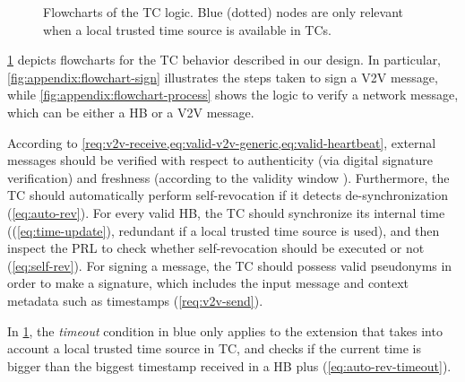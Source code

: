 \begin{figure}
\begin{subfigure}[T]{.4\columnwidth}
    \end{subfigure}
    \begin{minipage}{.45\columnwidth}
        \leavevmode{}
        \label{fig:appendix:flowchart-sign}
    \end{minipage}\hfil
    \begin{minipage}{.45\columnwidth}
        \leavevmode{}
        \label{fig:appendix:flowchart-process}
    \end{minipage}
    \caption{Flowcharts of the \acs{TC} logic. Blue (dotted) nodes are only
    relevant when a local trusted time source is available in \acsp{TC}.}
    \label{fig:appendix:flowchart}
\end{figure}

\cref{fig:appendix:flowchart} depicts flowcharts for the \ac{TC} behavior
described in our design. In particular, \cref{fig:appendix:flowchart-sign}
illustrates the steps taken to sign a \ac{V2V} message, while
\cref{fig:appendix:flowchart-process} shows the logic to verify a network
message, which can be either a \ac{HB} or a \ac{V2V} message.

According to \cref{req:v2v-receive,eq:valid-v2v-generic,eq:valid-heartbeat},
external messages should be verified with respect to authenticity (via digital
signature verification) and freshness (according to the validity window
\paramtt). Furthermore, the \ac{TC} should automatically perform self-revocation
if it detects de-synchronization (\cref{eq:auto-rev}). For every valid \ac{HB},
the \ac{TC} should synchronize its internal time \funcnow{}
((\cref{eq:time-update}), redundant if a local trusted time source is used), and
then inspect the \ac{PRL} to check whether self-revocation should be executed or
not (\cref{eq:self-rev}). For signing a message, the \ac{TC} should possess
valid pseudonyms in order to make a signature, which includes the input message
and context metadata such as timestamps (\cref{req:v2v-send}).

In \cref{fig:appendix:flowchart}, the \emph{timeout} condition in blue only
applies to the extension that takes into account a local trusted time source in
\ac{TC}, and checks if the current time is bigger than the biggest timestamp
received in a \ac{HB} plus \paramtt{} (\cref{eq:auto-rev-timeout}).